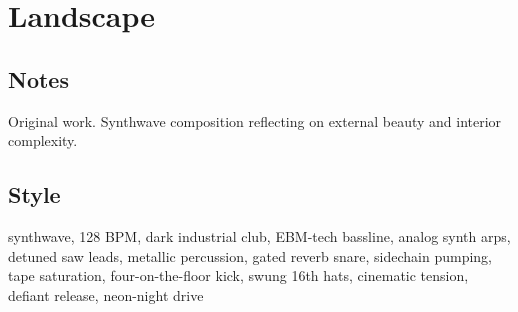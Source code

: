\section{Landscape}

\subsection{Notes}
Original work.
Synthwave composition reflecting on external beauty and interior complexity.

\subsection{Style}
synthwave, 128 BPM, dark industrial club, EBM-tech bassline, analog synth arps, detuned saw leads, metallic percussion, gated reverb snare, sidechain pumping, tape saturation, four-on-the-floor kick, swung 16th hats, cinematic tension, defiant release, neon-night drive

